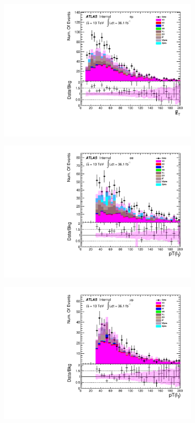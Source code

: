 \begin{figure}[h]
\begin{minipage}[t]{0.33\linewidth}
 \label{fig:nominal:MET_mumu.pdf}
 \end{minipage}
\begin{minipage}[t]{0.33\linewidth}
 \centering
 \includegraphics[width=0.9\textwidth,angle=-90]{fig/nominal/MET_emu.pdf}
 \label{fig:nominal:MET_emu.pdf}
 \end{minipage}
\begin{minipage}[t]{0.33\linewidth}
 \centering
 \includegraphics[width=0.9\textwidth,angle=-90]{fig/nominal/pt_leadinglepton_ee.pdf}
 \label{fig:nominal:pt_leadinglepton_ee.pdf}
 \end{minipage}
\begin{minipage}[t]{0.33\linewidth}
 \centering
 \includegraphics[width=0.9\textwidth,angle=-90]{fig/nominal/pt_leadinglepton_mumu.pdf}

\end{minipage}
\end{figure}
